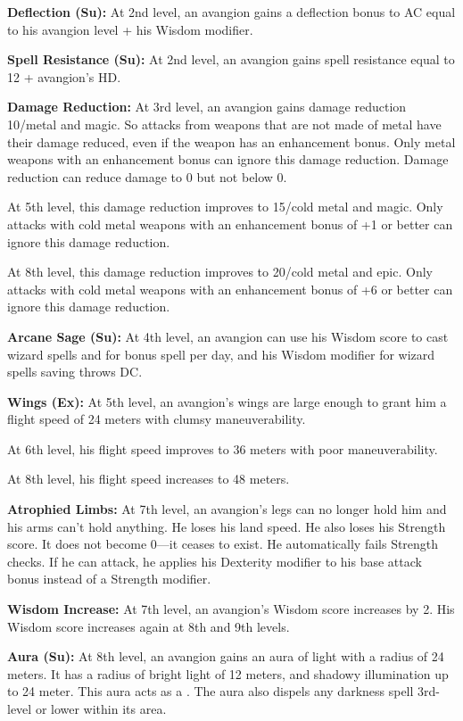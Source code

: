 {\textbf{Deflection (Su):} At 2nd level, an avangion gains a deflection bonus to AC equal to his avangion level + his Wisdom modifier.

\textbf{Spell Resistance (Su):} At 2nd level, an avangion gains spell resistance equal to 12 + avangion's HD.

\textbf{Damage Reduction:} At 3rd level, an avangion gains damage reduction 10/metal and magic. So attacks from weapons that are not made of metal have their damage reduced, even if the weapon has an enhancement bonus. Only metal weapons with an enhancement bonus can ignore this damage reduction. Damage reduction can reduce damage to 0 but not below 0.

At 5th level, this damage reduction improves to 15/cold metal and magic. Only attacks with cold metal weapons with an enhancement bonus of +1 or better can ignore this damage reduction.

At 8th level, this damage reduction improves to 20/cold metal and epic. Only attacks with cold metal weapons with an enhancement bonus of +6 or better can ignore this damage reduction.

\textbf{Arcane Sage (Su):} At 4th level, an avangion can use his Wisdom score to cast wizard spells and for bonus spell per day, and his Wisdom modifier for wizard spells saving throws DC.

\textbf{Wings (Ex):} At 5th level, an avangion's wings are large enough to grant him a flight speed of 24 meters with clumsy maneuverability.

At 6th level, his flight speed improves to 36 meters with poor maneuverability.

At 8th level, his flight speed increases to 48 meters.

\textbf{Atrophied Limbs:} At 7th level, an avangion's legs can no longer hold him and his arms can't hold anything. He loses his land speed. He also loses his Strength score. It does not become 0---it ceases to exist. He automatically fails Strength checks. If he can attack, he applies his Dexterity modifier to his base attack bonus instead of a Strength modifier.

\textbf{Wisdom Increase:} At 7th level, an avangion's Wisdom score increases by 2. His Wisdom score increases again at 8th and 9th levels.

\textbf{Aura (Su):} At 8th level, an avangion gains an aura of light with a radius of 24 meters. It has a radius of bright light of 12 meters, and shadowy illumination up to 24 meter. This aura acts as a . The aura also dispels any darkness spell 3rd-level or lower within its area.

}
